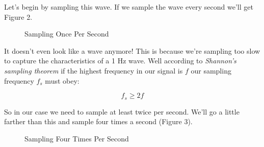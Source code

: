 \documentclass[12pt,a6paper]{book}
\begin{document}
Let's begin by sampling this wave. If we sample the wave every second we'll get Figure 2. 

\begin{figure}[!htb]
\caption{\label{fig:my-label} Sampling Once Per Second}
\end{figure}

It doesn't even look like a wave anymore! This is because we're sampling too slow to capture the characteristics of a 1 Hz wave. Well according to \textit{Shannon's sampling theorem} \cite{practicalprocessing} if the highest frequency in our signal is $f$ our sampling frequency $f_s$ must obey:

\begin{equation}
f_s \geq 2f
\end{equation}

So in our case we need to sample at least twice per second. We'll go a little farther than this and sample four times a second (Figure 3).

\begin{figure}[!htb]
\caption{\label{fig:my-label} Sampling Four Times Per Second}
\end{figure}
\end{document}
